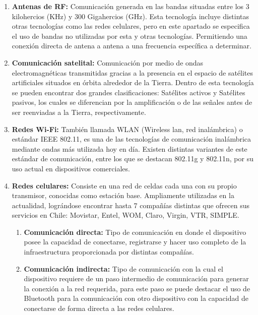 \begin{enumerate}
\item \textbf{Antenas de RF:}\cite{RF}
Comunicación generada en las bandas situadas entre los 3 kilohercios (KHz) y 300 Gigahercios (GHz). Esta tecnología incluye distintas otras tecnologías como las redes celulares, pero en este apartado se especifica el uso de bandas no utilizadas por esta y otras tecnologías. Permitiendo una conexión directa de antena a antena a una frecuencia específica a determinar.

\item \textbf{Comunicación satelital:}\cite{satelite}
Comunicación  por medio de ondas electromagnéticas transmitidas gracias a la presencia en el espacio de satélites artificiales situados en órbita alrededor de la Tierra. Dentro de esta tecnología se pueden encontrar dos grandes clasificaciones: Satélites activos y Satélites pasivos, los cuales se diferencian por la amplificación o de las señales antes de ser reenviadas a la Tierra, respectivamente.

\item \textbf{Redes Wi-Fi:}\cite{wifi}
También llamada WLAN (Wireless lan, red inalámbrica) o estándar IEEE 802.11, es una de las tecnologías de comunicación inalámbrica mediante ondas más utilizada hoy en día. Existen distintas variantes de este estándar de comunicación, entre los que se destacan 802.11g y 802.11n, por su uso actual en dispositivos comerciales.

\item \textbf{Redes celulares:}\cite{celular}
Consiste en una red de celdas cada una con su propio transmisor, conocidas como estación base. Ampliamente utilizadas en la actualidad, lográndose encontrar hasta 7 compañías distintas que ofrecen sus servicios en Chile: Movistar, Entel, WOM, Claro, Virgin, VTR, SIMPLE.
\begin{enumerate}
	\item \textbf{Comunicación directa:}
	Tipo de comunicación en donde el dispositivo posee la capacidad de conectarse, registrarse y hacer uso completo de la infraestructura proporcionada por distintas compañías.
	
	\item \textbf{Comunicación indirecta:}
	Tipo de comunicación con la cual el dispositivo requiere de un paso intermedio de comunicación para generar la conexión a la red requerida, para este paso se puede destacar el uso de Bluetooth para la comunicación con otro dispositivo con la capacidad de conectarse de forma directa a las redes celulares.
\end{enumerate}	
\end{enumerate}	

